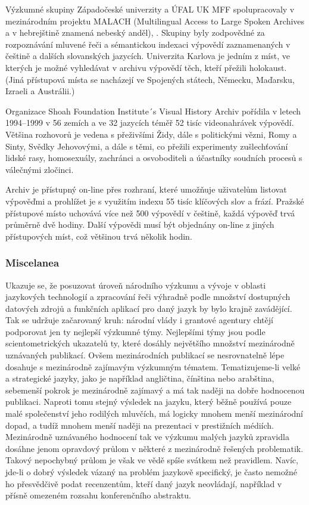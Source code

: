 \begin{multicols}{2}
Výzkumné skupiny Západočeské univerzity a ÚFAL UK MFF spolupracovaly v mezinárodním projektu MALACH (Multilingual Access to Large Spoken Archives a v hebrejštině znamená nebeský anděl), \cite{Psutka2005}. Skupiny byly zodpovědné za rozpoznávání mluvené řeči a sémantickou indexaci výpovědí zaznamenaných v češtině a dalších slovanských jazycích. Univerzita Karlova je jedním z míst, ve kterých je možné vyhledávat v archivu výpovědí těch, kteří přežili holokaust. (Jiná přístupová místa se nacházejí ve Spojených státech, Německu, Maďarsku, Izraeli a Austrálii.)

Organizace Shoah Foundation Institute´s Visual History Archiv pořídila v letech 1994--1999 v 56 zemích a ve 32 jazycích téměř 52 tisíc videonahrávek výpovědí. Většina rozhovorů je vedena s přeživšími Židy, dále s politickými vězni, Romy a Sinty, Svědky Jehovovými, a dále s těmi, co přežili experimenty zušlechťování lidské rasy, homosexuály, zachránci a osvoboditeli a účastníky soudních procesů s válečnými zločinci.

Archiv je přístupný on-line přes rozhraní, které umožňuje uživatelům listovat výpověďmi a prohlížet je s využitím indexu 55 tisíc klíčových slov a  frází. Pražské přístupové místo uchovává více než 500 výpovědí v češtině, každá výpověď trvá průměrně dvě hodiny. Další výpovědi musí být objednány on-line z jiných přístupových míst, což většinou trvá několik hodin.

\subsubsection{Miscelanea}

Ukazuje se, že posuzovat úroveň národního výzkumu a vývoje v oblasti jazykových technologií a zpracování řeči výhradně podle množství dostupných datových zdrojů a funkčních aplikací pro daný jazyk by bylo krajně zavádějící. Tak se udržuje začarovaný kruh: národní vlády i grantové agentury chtějí podporovat jen ty nejlepší výzkumné týmy. Nejlepšími týmy jsou podle scientometrických ukazatelů ty, které dosáhly největšího množství mezinárodně uznávaných publikací. Ovšem mezinárodních publikací se nesrovnatelně lépe dosahuje s mezinárodně zajímavým výzkumným tématem. Tematizujeme-li velké a strategické jazyky, jako je například angličtina, čínština nebo arabština, sebemenší pokrok je mezinárodně zajímavý a má tak naději na dobře hodnocenou publikaci. Naproti tomu stejný výsledek na jazyku, který běžně používá pouze malé společenství jeho rodilých mluvčích, má logicky mnohem menší mezinárodní dopad, a tudíž mnohem menší naději na prezentaci v prestižních médiích. Mezinárodně uznávaného hodnocení tak ve výzkumu malých jazyků zpravidla dosáhne jenom opravdový průlom v některé z mezinárodně řešených problematik. Takový nepochybný průlom je však ve vědě spíše svátkem než pravidlem. Navíc, jde-li o dobrý výsledek vázaný na problém jazykově specifický, je často nemožné ho přesvědčivě podat recenzentům, kteří daný jazyk neovládají, například v přísně omezeném rozsahu konferenčního abstraktu.


\end{multicols}

